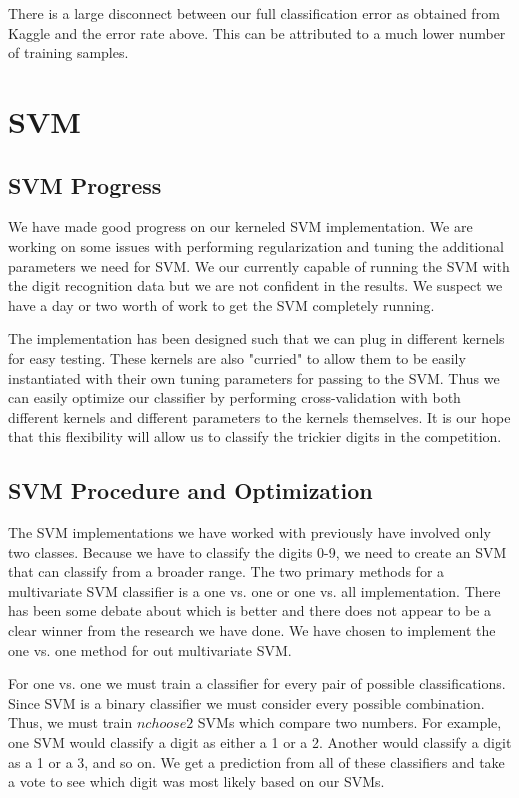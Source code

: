 \documentclass{article} %
\begin{document}
There is a large disconnect between our full classification error as obtained from Kaggle and the error rate above. This can be attributed to a much lower number of training samples. 

\section{SVM}

\subsection{SVM Progress}

We have made good progress on our kerneled SVM implementation.  We are working on some issues with performing regularization and tuning the additional parameters we need for SVM.  We our currently capable of running the SVM with the digit recognition data but we are not confident in the results. We suspect we have a day or two worth of work to get the SVM completely running.  

The implementation has been designed such that we can plug in different kernels for easy testing.  These kernels are also "curried" to allow them to be easily instantiated with their own tuning parameters for passing to the SVM.  Thus we can easily optimize our classifier by performing cross-validation with both different kernels and different parameters to the kernels themselves.  It is our hope that this flexibility will allow us to classify the trickier digits in the competition. 

\subsection{SVM Procedure and Optimization}

The SVM implementations we have worked with previously have involved only two classes. Because we have to classify the digits 0-9, we need to create an SVM that can classify from a broader range.  The two primary methods for a multivariate SVM classifier is a one vs. one or one vs. all implementation.  There has been some debate about which is better and there does not appear to be a clear winner from the research we have done.  We have chosen to implement the one vs. one method for out multivariate SVM.  

For one vs. one we must train a classifier for every pair of possible classifications.  Since SVM is a binary classifier we must consider every possible combination.  Thus, we must train $n choose 2$ SVMs which compare two numbers. For example, one SVM would classify a digit as either a 1 or a 2. Another would classify a digit as a 1 or a 3, and so on. We get a prediction from all of these classifiers and take a vote to see which digit was most likely based on our SVMs. 
\end{document}
